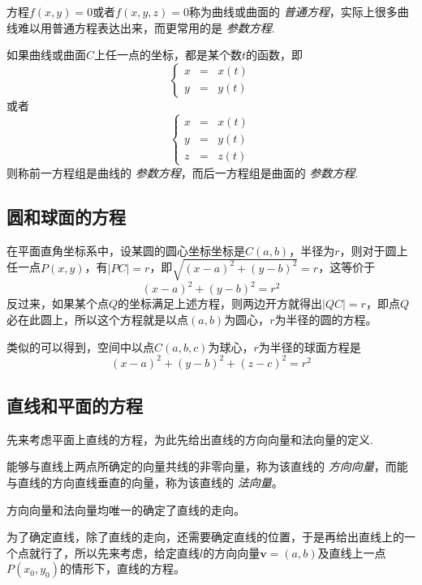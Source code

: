 方程$f(x,y)=0$或者$f(x,y,z)=0$称为曲线或曲面的 \emph{普通方程}，实际上很多曲线难以用普通方程表达出来，而更常用的是 \emph{参数方程}.

\begin{definition}
  如果曲线或曲面$C$上任一点的坐标，都是某个数$t$的函数，即
  \[ \left\{
      \begin{array}{lll}
        x & = & x(t) \\
        y & = & y(t)
      \end{array}
    \right. \]
  或者
  \[ \left\{
      \begin{array}{lll}
        x & = & x(t) \\
        y & = & y(t) \\
        z & = & z(t)
      \end{array}
    \right. \]
  则称前一方程组是曲线的 \emph{参数方程}，而后一方程组是曲面的 \emph{参数方程}.
\end{definition}

\subsection{圆和球面的方程}
\label{sec:equation-of-circle-and-ball}

在平面直角坐标系中，设某圆的圆心坐标坐标是$C(a,b)$，半径为$r$，则对于圆上任一点$P(x,y)$，有$|PC|=r$，即$\sqrt{(x-a)^2+(y-b)^2}=r$，这等价于
\[ (x-a)^2+(y-b)^2=r^2 \]
反过来，如果某个点$Q$的坐标满足上述方程，则两边开方就得出$|QC|=r$，即点$Q$必在此圆上，所以这个方程就是以点$(a,b)$为圆心，$r$为半径的圆的方程。

类似的可以得到，空间中以点$C(a,b,c)$为球心，$r$为半径的球面方程是
\[ (x-a)^2+(y-b)^2+(z-c)^2=r^2 \]


\subsection{直线和平面的方程}
\label{sec:equation-of-line-and-plane}

先来考虑平面上直线的方程，为此先给出直线的方向向量和法向量的定义.

\begin{definition}
  能够与直线上两点所确定的向量共线的非零向量，称为该直线的 \emph{方向向量}，而能与直线的方向直线垂直的向量，称为该直线的 \emph{法向量}。
\end{definition}

方向向量和法向量均唯一的确定了直线的走向。

为了确定直线，除了直线的走向，还需要确定直线的位置，于是再给出直线上的一个点就行了，所以先来考虑，给定直线$l$的方向向量$\bm{v}=(a,b)$及直线上一点$P(x_0,y_0)$的情形下，直线的方程。

